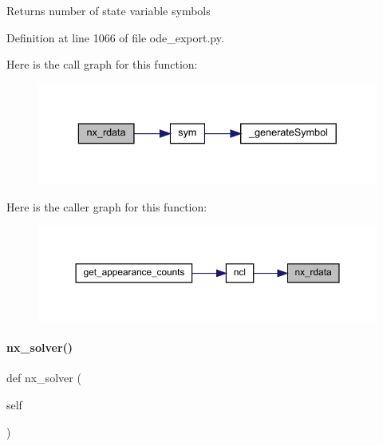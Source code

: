 \begin{DoxyReturn}{Returns}
number of state variable symbols 
\end{DoxyReturn}


Definition at line 1066 of file ode\+\_\+export.\+py.

Here is the call graph for this function\+:
\nopagebreak
\begin{figure}[H]
\begin{center}
\leavevmode
\includegraphics[width=336pt]{classamici_1_1ode__export_1_1_o_d_e_model_ab77e1355e82f8fe321044cc622e4446a_cgraph}
\end{center}
\end{figure}
Here is the caller graph for this function\+:
\nopagebreak
\begin{figure}[H]
\begin{center}
\leavevmode
\includegraphics[width=350pt]{classamici_1_1ode__export_1_1_o_d_e_model_ab77e1355e82f8fe321044cc622e4446a_icgraph}
\end{center}
\end{figure}
\mbox{\label{classamici_1_1ode__export_1_1_o_d_e_model_ae4c34666f3d1d7f0c7a54a0b2322a1f3}} 
\paragraph{\texorpdfstring{nx\_solver()}{nx\_solver()}}
{\footnotesize\ttfamily def nx\+\_\+solver (\begin{DoxyParamCaption}\item[{}]{self }\end{DoxyParamCaption})}

